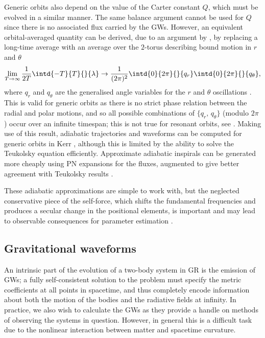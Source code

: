Generic orbits also depend on the value of the Carter constant $Q$, which must be evolved in a similar manner. The same balance argument cannot be used for $Q$ since there is no associated flux carried by the GWs. However, an equivalent orbital-averaged quantity can be derived, due to an argument by \citet{mino_perturbative_2003}, by replacing a long-time average with an average over the $2$-torus describing bound motion in $r$ and $\theta$
\begin{equation}
\label{eq:emri-longtime-av}
\lim_{T\rightarrow\infty} \frac1{2T}\intd{-T}{T}{}{\lambda} \rightarrow \frac1{(2\pi)^2} \intd{0}{2\pi}{}{q_r} \intd{0}{2\pi}{}{q_\theta},
\end{equation}
where $q_r$ and $q_\theta$ are the generalised angle variables for the $r$ and $\theta$ oscillations \citep{sago_adiabatic_2006}. This is valid for generic orbits as there is no strict phase relation between the radial and polar motions, and so all possible combinations of $\{q_r,\,q_\theta\}$ (modulo $2\pi$) occur over an infinite timespan; this is not true for resonant orbits, see . Making use of this result, adiabatic trajectories and waveforms can be computed for generic orbits in Kerr \citep{drasco_gravitational_2006,sundararajan_towards_2008}, although this is limited by the ability to solve the Teukolsky equation efficiently. Approximate adiabatic inspirals can be generated more cheaply using PN expansions for the fluxes, augmented to give better agreement with Teukolsky results \citep{gair_improved_2006}.

These adiabatic approximations are simple to work with, but the neglected conservative piece of the self-force, which shifts the fundamental frequencies and produces a secular change in the positional elements, is important \citep{pound_limitations_2005} and may lead to observable consequences for parameter estimation \citep{huerta_influence_2009}.


\subsection{Gravitational waveforms}
\label{sec:EMRI-GWs}
An intrinsic part of the evolution of a two-body system in GR is the emission of GWs; a fully self-consistent solution to the problem must specify the metric coefficients at all points in spacetime, and thus completely encode information about both the motion of the bodies and the radiative fields at infinity. In practice, we also wish to calculate the GWs as they provide a handle on methods of observing the systems in question. However, in general this is a difficult task due to the nonlinear interaction between matter and spacetime curvature.

